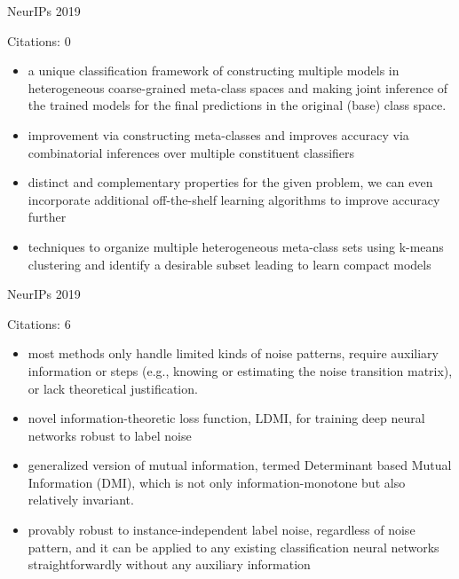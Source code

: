 \documentclass[11pt]{article}
\begin{document}
\vspace{2cm}

\noindent NeurIPs 2019

\noindent Citations: 0

\begin{itemize}
  \item a unique classification framework of constructing multiple models in heterogeneous coarse-grained meta-class spaces and making joint inference of the trained models for the final predictions in the original (base) class space.
  \item improvement via constructing meta-classes and improves accuracy via combinatorial inferences over multiple constituent classifiers
  \item distinct and complementary properties for the given problem, we can even incorporate additional off-the-shelf learning algorithms to improve accuracy further
  \item techniques to organize multiple heterogeneous meta-class sets using k-means clustering and identify a desirable subset leading to learn compact models
\end{itemize}

\vspace{2cm}

\noindent NeurIPs 2019

\noindent Citations: 6

\begin{itemize}
  \item most methods only handle limited kinds of noise patterns, require auxiliary information or steps (e.g., knowing or estimating the noise transition matrix), or lack theoretical justification. 
  \item novel information-theoretic loss function, LDMI, for training deep neural networks robust to label noise
  \item generalized version of mutual information, termed Determinant based Mutual Information (DMI), which is not only information-monotone but also relatively invariant.
  \item provably robust to instance-independent label noise, regardless of noise pattern, and it can be applied to any existing classification neural networks straightforwardly without any auxiliary information
\end{itemize}
\end{document}
